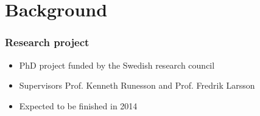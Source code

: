 \documentclass[11pt]{beamer} %
\begin{document}
\section{Background}
\begin{frame}
 \frametitle{Research project}
 \begin{itemize}
  \item PhD project funded by the Swedish research council
  \item Supervisors Prof. Kenneth Runesson and Prof. Fredrik Larsson
  \item Expected to be finished in 2014
 \end{itemize}
\end{frame}

\end{document}
